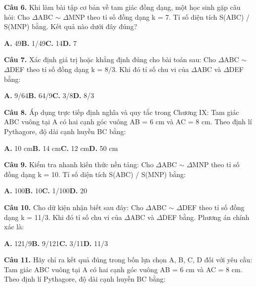 \documentclass[11pt,a4paper]{article}
\begin{document}
\textbf{\color{primary} Câu 6.} Khi làm bài tập cơ bản về tam giác đồng dạng, một học sinh gặp câu hỏi: Cho $\Delta$ABC $\sim$ $\Delta$MNP theo tỉ số đồng dạng k = 7. Tỉ số diện tích S(ABC) / S(MNP) bằng. Kết quả nào dưới đây đúng?\par
\hspace*{1.5em}\textbf{A.} 49\quad\quad \textbf{B.} 1/49\quad\quad \textbf{C.} 14\quad\quad \textbf{D.} 7\par\vspace{2pt}
\textbf{\color{primary} Câu 7.} Xác định giá trị hoặc khẳng định đúng cho bài toán sau: Cho $\Delta$ABC $\sim$ $\Delta$DEF theo tỉ số đồng dạng k = 8/3. Khi đó tỉ số chu vi của $\Delta$ABC và $\Delta$DEF bằng:\par
\hspace*{1.5em}\textbf{A.} 9/64\quad\quad \textbf{B.} 64/9\quad\quad \textbf{C.} 3/8\quad\quad \textbf{D.} 8/3\par\vspace{2pt}
\textbf{\color{primary} Câu 8.} Áp dụng trực tiếp định nghĩa và quy tắc trong Chương IX: Tam giác ABC vuông tại A có hai cạnh góc vuông AB = 6 cm và AC = 8 cm. Theo định lí Pythagore, độ dài cạnh huyền BC bằng:\par
\hspace*{1.5em}\textbf{A.} 10 cm\quad\quad \textbf{B.} 14 cm\quad\quad \textbf{C.} 12 cm\quad\quad \textbf{D.} 50 cm\par\vspace{2pt}
\textbf{\color{primary} Câu 9.} Kiểm tra nhanh kiến thức nền tảng: Cho $\Delta$ABC $\sim$ $\Delta$MNP theo tỉ số đồng dạng k = 10. Tỉ số diện tích S(ABC) / S(MNP) bằng:\par
\hspace*{1.5em}\textbf{A.} 100\quad\quad \textbf{B.} 10\quad\quad \textbf{C.} 1/100\quad\quad \textbf{D.} 20\par\vspace{2pt}
\textbf{\color{primary} Câu 10.} Cho dữ kiện nhận biết sau đây: Cho $\Delta$ABC $\sim$ $\Delta$DEF theo tỉ số đồng dạng k = 11/3. Khi đó tỉ số chu vi của $\Delta$ABC và $\Delta$DEF bằng. Phương án chính xác là:\par
\hspace*{1.5em}\textbf{A.} 121/9\quad\quad \textbf{B.} 9/121\quad\quad \textbf{C.} 3/11\quad\quad \textbf{D.} 11/3\par\vspace{2pt}
\textbf{\color{primary} Câu 11.} Hãy chỉ ra kết quả đúng trong bốn lựa chọn A, B, C, D đối với yêu cầu: Tam giác ABC vuông tại A có hai cạnh góc vuông AB = 6 cm và AC = 8 cm. Theo định lí Pythagore, độ dài cạnh huyền BC bằng:\par
\end{document}
